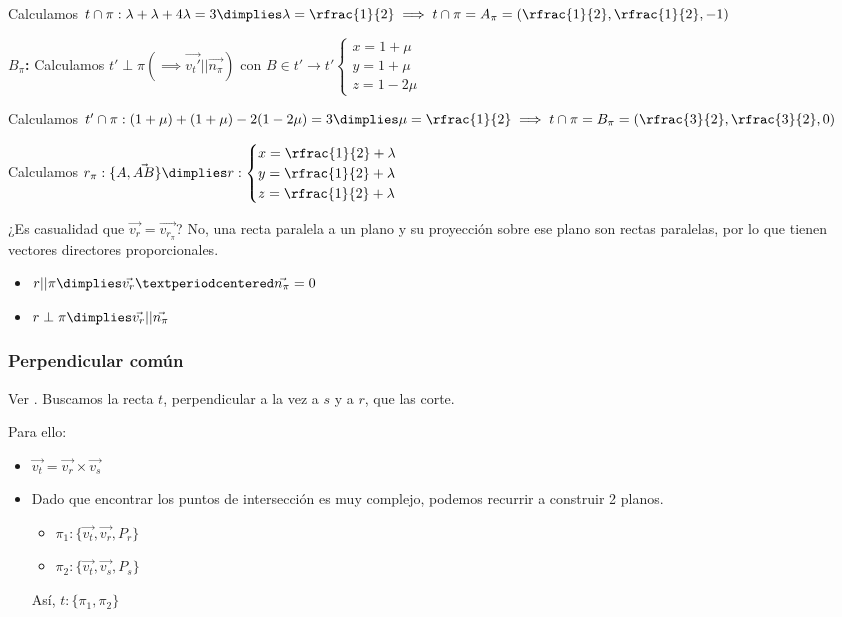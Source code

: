 \begin{problem}
\begin{enumerate}
  Calculamos $t\cap\pi: \lambda+\lambda+4\lambda=3\dimplies \lambda=\rfrac{1}{2} \implies t\cap\pi =A_{\pi}=\left(\rfrac{1}{2},\rfrac{1}{2},-1\right)$

  \textbf{$B_{\pi}$:} Calculamos $t'\perp\pi (\implies \vec{v_t'}||\vec{n_{\pi}})$ con $B\in t'\to t'\begin{cases}x=1+\mu\\y=1+\mu\\z=1-2\mu\end{cases}$

  Calculamos $t'\cap\pi: (1+\mu)+(1+\mu)-2(1-2\mu)=3\dimplies \mu=\rfrac{1}{2} \implies t\cap\pi =B_{\pi}=\left(\rfrac{3}{2},\rfrac{3}{2},0\right)$

  Calculamos $r_{\pi}:\{A,\vec{AB}\} \dimplies r:\begin{cases}x=\rfrac{1}{2}+\lambda\\y=\rfrac{1}{2}+\lambda\\z=\rfrac{1}{2}+\lambda\end{cases}$

\obs ¿Es casualidad que $\vec{v_r} = \vec{v_{r_{\pi}}}$? No, una recta paralela a un plano y su proyección sobre ese plano son rectas paralelas, por lo que tienen vectores directores proporcionales.
\end{enumerate}

\end{problem}


\begin{itemize}
  \item $r || \pi \dimplies \vec{v_r}·\vec{n_{\pi}} = 0$
  \item $r\perp \pi \dimplies \vec{v_r}||\vec{n_{\pi}}$
\end{itemize}


\subsubsection{Perpendicular común}

Ver . Buscamos la recta $t$, perpendicular a la vez a $s$ y a $r$, que las corte. 

Para ello:
\begin{itemize}
  \item $\vec{v_t} = \vec{v_r}\times\vec{v_s}$
  \item Dado que encontrar los puntos de intersección es muy complejo, podemos recurrir a construir 2 planos.
  \begin{itemize}
    \item $\pi_1: \{\vec{v_t},\vec{v_r},P_r\}$
    \item $\pi_2: \{\vec{v_t},\vec{v_s},P_s\}$
  \end{itemize}
  Así, $t:\{\pi_1,\pi_2\}$
\end{itemize}

